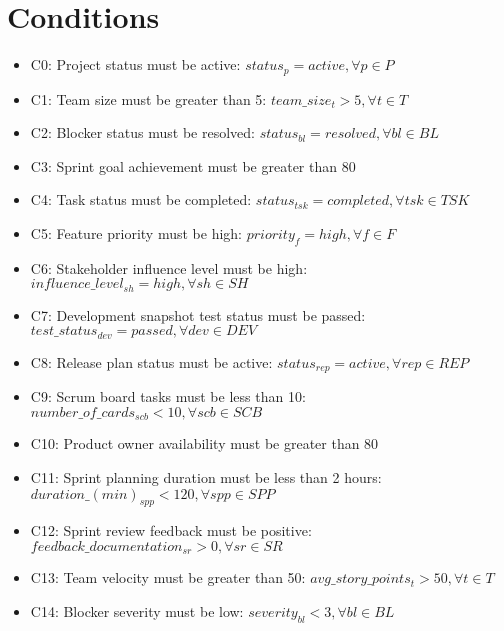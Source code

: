 \documentclass{article}
\begin{document}
\section{Conditions}
\begin{itemize}
    \item C0: Project status must be active: $status_p = active, \forall p \in P$
    \item C1: Team size must be greater than 5: $team\_size_t > 5, \forall t \in T$
    \item C2: Blocker status must be resolved: $status_{bl} = resolved, \forall bl \in BL$
    \item C3: Sprint goal achievement must be greater than 80%
    \item C4: Task status must be completed: $status_{tsk} = completed, \forall tsk \in TSK$
    \item C5: Feature priority must be high: $priority_f = high, \forall f \in F$
    \item C6: Stakeholder influence level must be high: $influence\_level_{sh} = high, \forall sh \in SH$
    \item C7: Development snapshot test status must be passed: $test\_status_{dev} = passed, \forall dev \in DEV$
    \item C8: Release plan status must be active: $status_{rep} = active, \forall rep \in REP$
    \item C9: Scrum board tasks must be less than 10: $number\_of\_cards_{scb} < 10, \forall scb \in SCB$
    \item C10: Product owner availability must be greater than 80%
    \item C11: Sprint planning duration must be less than 2 hours: $duration\_(min)_{spp} < 120, \forall spp \in SPP$
    \item C12: Sprint review feedback must be positive: $feedback\_documentation_{sr} > 0, \forall sr \in SR$
    \item C13: Team velocity must be greater than 50: $avg\_story\_points_t > 50, \forall t \in T$
    \item C14: Blocker severity must be low: $severity_{bl} < 3, \forall bl \in BL$
\end{itemize}
\end{document}
